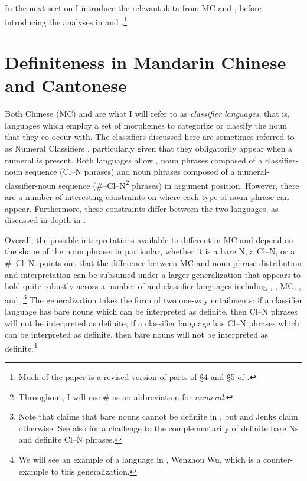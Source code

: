 \documentclass[output=paper
,modfonts
,nonflat]{langsci/langscibook}
\begin{document}
In the next section I introduce the relevant data from MC and , before introducing the analyses in \citet{ChengSybesma1999} and \citet{Simpson2005}.\footnote{Much of the paper is a revised version of parts of \S4 and \S5 of \citet{Hall2015}.}

\section{Definiteness in Mandarin Chinese and Cantonese} 

Both  Chinese (MC) and  are what I will refer to as \textit{classifier languages}, that is, languages which employ a set of morphemes to categorize or classify the noun that they co-occur with. The classifiers discussed here are sometimes referred to as Numeral Classifiers \citep{Aikhenvald2000}, particularly given that they obligatorily appear when a numeral is present. Both languages allow , noun phrases composed of a classifier-noun sequence (Cl--N phrases) and noun phrases composed of a numeral-classifier-noun sequence (\#--Cl--N\footnote{Throughout, I will use \# as an abbreviation for \textit{numeral}.} phrases) in argument position. However, there are a number of interesting constraints on where each type of noun phrase can appear. Furthermore, these constraints differ between the two languages, as discussed in depth in \citet{ChengSybesma1999}.


Overall, the possible interpretations available to different  in MC and  depend on the shape of the noun phrase: in particular, whether it is a bare N, a Cl--N, or a \#--Cl--N. \citet{Jenks2012} points out that the difference between MC and  noun phrase distribution and interpretation can be subsumed under a larger generalization that appears to hold quite robustly across a number of  and  classifier languages including , , MC, , and .\footnote{Note that \citet{Trinh2011} claims that bare nouns cannot be definite in , but \citet{Nguyen2004} and Jenks claim otherwise. See also \citet{SimpsonEtAlii2011} for a challenge to the complementarity of definite bare Ns and definite Cl--N phrases.} The generalization takes the form of two one-way entailments: if a classifier language has bare nouns which can be interpreted as definite, then Cl--N phrases will not be interpreted as definite; if a classifier language has Cl--N phrases which can be interpreted as definite, then bare nouns will not be interpreted as definite.\footnote{We will see an example of a language in , Wenzhou Wu, which is a counter-example to this generalization.} 
\end{document}
